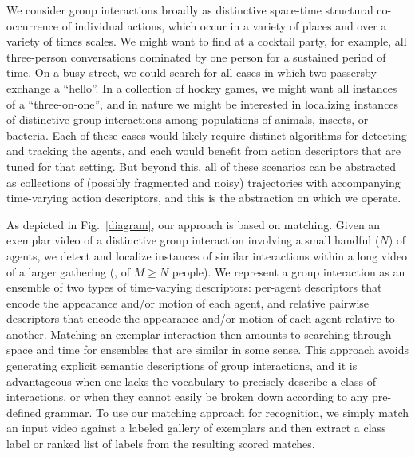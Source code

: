 We consider group interactions broadly as distinctive space-time structural co-occurrence of individual actions, which occur in a variety of places and over a variety of times scales. We might want to find at a cocktail party, for example, all three-person conversations dominated by one person for a sustained period of time. On a busy street, we could search for all cases in which two passersby exchange a ``hello''. In a collection of hockey games, we might want all instances of a ``three-on-one'', and in nature we might be interested in localizing instances of distinctive group interactions among populations of animals, insects, or bacteria. Each of these cases would likely require distinct algorithms for detecting and tracking the agents, and each would benefit from action descriptors that are tuned for that setting. But beyond this, all of these scenarios can be abstracted as collections of (possibly fragmented and noisy) trajectories with accompanying time-varying action descriptors, and this is the abstraction on which we operate.
 
As depicted in Fig.~\ref{diagram}, our approach is based on matching. Given an exemplar video of a distinctive group interaction involving a small handful ($N$) of agents, we detect and localize instances of similar interactions within a long video of a larger gathering (\ie, of $M\ge N$ people). We represent a group interaction as an ensemble of two types of time-varying descriptors: per-agent descriptors that encode the appearance and/or motion of each agent, and relative pairwise descriptors that encode the appearance and/or motion of each agent relative to another. Matching an exemplar interaction then amounts to searching through space and time for ensembles that are similar in some sense. This approach avoids generating explicit semantic descriptions of group interactions, and it is advantageous when one lacks the vocabulary to precisely describe a class of interactions, or when they cannot easily be broken down according to any pre-defined grammar. To use our matching approach for recognition, we simply match an input video against a labeled gallery of exemplars and then extract a class label or ranked list of labels from the resulting scored matches.

